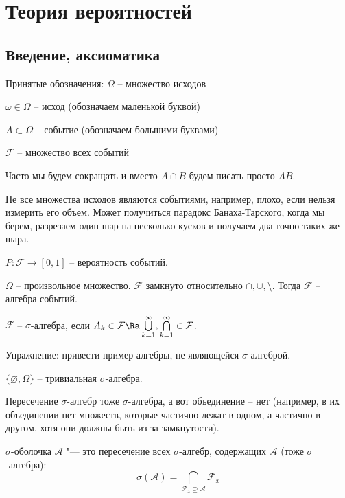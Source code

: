 \chapter{Теория вероятностей}
\section{Введение, аксиоматика}
Принятые обозначения: 
$\Omega$ -- множество исходов

$\omega \in \Omega$ -- исход (обозначаем маленькой буквой)

$A \subset \Omega$ -- событие (обозначаем большими буквами)

$\mathcal{F}$ -- множество всех событий

Часто мы будем сокращать и вместо $A \cap B$ будем писать просто $AB$.

\begin{Rem}
Не все множества исходов являются событиями, например, плохо, если нельзя измерить его объем.
Может получиться парадокс Банаха-Тарского, когда мы берем, разрезаем один шар на несколько кусков и получаем два точно таких же шара.
\end{Rem}

$P: \mathcal{F} \to [0, 1]$ -- вероятность событий.

\begin{Def}
    $\Omega$ -- произвольное множество. $\mathcal{F}$ замкнуто относительно $\cap, \cup, \setminus$. Тогда $\mathcal{F}$ -- алгебра событий.
\end{Def}
\begin{Def}
    $\mathcal{F}$ -- $\sigma$-алгебра, если $A_k \in \mathcal{F} \Ra \bigcup\limits_{k=1}^{\infty}, \bigcap\limits_{k=1}^{\infty} \in \mathcal{F}$.
\end{Def}
Упражнение: привести пример алгебры, не являющейся $\sigma$-алгеброй.
\begin{exmp}
$\{\varnothing, \Omega \}$ -- тривиальная $\sigma$-алгебра.
\end{exmp}

Пересечение $\sigma$-алгебр тоже $\sigma$-алгебра, а вот объединение -- нет 
(например, в их объединении нет множеств, которые частично лежат в одном, а частично в другом, хотя они должны быть из-за замкнутости).

\begin{Def}
	$\sigma$-оболочка $\mathcal A$ "--- это пересечение всех $\sigma$-алгебр, содержащих $\mathcal A$ (тоже $\sigma$-алгебра):
	\[
		\sigma(\mathcal A) = \bigcap\limits_{{\mathcal F}_x \supseteq \mathcal A} \mathcal F_x
	\]
\end{Def}

